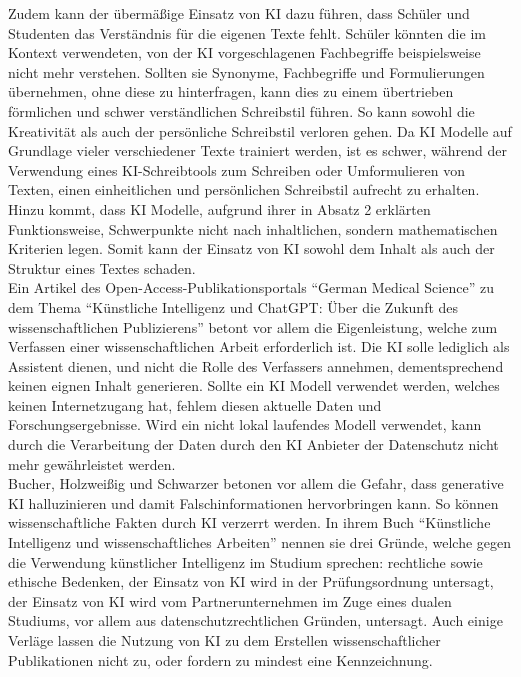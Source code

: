 \documentclass[../main.tex]{subfiles}
\begin{document}
Zudem kann der übermäßige Einsatz von KI dazu führen, dass Schüler und Studenten das Verständnis für die eigenen Texte fehlt. Schüler könnten die im 
Kontext verwendeten, von der KI vorgeschlagenen Fachbegriffe beispielsweise nicht mehr verstehen. Sollten sie Synonyme, Fachbegriffe und Formulierungen 
übernehmen, ohne diese zu hinterfragen, kann dies zu einem übertrieben förmlichen und schwer verständlichen Schreibstil führen\cite{teachers}. 
So kann sowohl die Kreativität als auch der persönliche Schreibstil verloren gehen. Da KI Modelle auf Grundlage vieler verschiedener Texte trainiert werden, ist es
schwer, während der Verwendung eines KI-Schreibtools zum Schreiben oder Umformulieren von Texten, einen einheitlichen und persönlichen Schreibstil aufrecht zu erhalten\cite{creativeWriting}. Hinzu kommt,
dass KI Modelle, aufgrund ihrer in Absatz 2 erklärten Funktionsweise, Schwerpunkte nicht nach inhaltlichen, sondern mathematischen Kriterien legen\cite{berensBolk}. Somit kann der 
Einsatz von KI sowohl dem Inhalt als auch der Struktur eines Textes schaden.\\

Ein Artikel des Open-Access-Publikationsportals "`German Medical Science"' zu dem Thema "`Künstliche Intelligenz und ChatGPT: Über die Zukunft des wissenschaftlichen Publizierens"'
betont vor allem die Eigenleistung, welche zum Verfassen einer wissenschaftlichen Arbeit erforderlich ist. Die KI solle lediglich als Assistent dienen, und
nicht die Rolle des Verfassers annehmen, dementsprechend keinen eignen Inhalt generieren. Sollte ein KI Modell verwendet werden, welches keinen Internetzugang hat,
fehlem diesen aktuelle Daten und Forschungsergebnisse. Wird ein nicht lokal laufendes Modell verwendet, kann durch die Verarbeitung der Daten durch den KI Anbieter
der Datenschutz nicht mehr gewährleistet werden.\cite{ZukunftWissenschaftlichesPublizieren} \\ Bucher, Holzweißig und Schwarzer betonen vor allem die Gefahr, dass 
generative KI halluzinieren und damit Falschinformationen hervorbringen kann. So können wissenschaftliche Fakten durch KI verzerrt werden. In ihrem Buch "`Künstliche Intelligenz und wissenschaftliches Arbeiten"' nennen sie drei 
Gründe, welche gegen die Verwendung künstlicher Intelligenz im Studium sprechen: rechtliche sowie ethische Bedenken, der Einsatz von KI wird in der Prüfungsordnung untersagt, 
der Einsatz von KI wird vom Partnerunternehmen im Zuge eines dualen Studiums, vor allem aus datenschutzrechtlichen Gründen, untersagt.\cite{BucherSchwarzerHolzwweißig} Auch einige Verläge lassen 
die Nutzung von KI zu dem Erstellen wissenschaftlicher Publikationen nicht zu, oder fordern zu mindest eine Kennzeichnung\cite{ZukunftWissenschaftlichesPublizieren}. 
\end{document}
